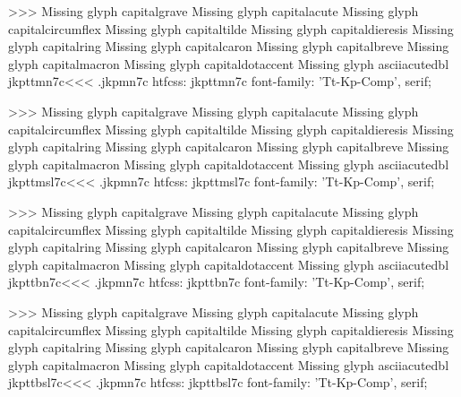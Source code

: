 >>>
Missing glyph	capitalgrave
Missing glyph	capitalacute
Missing glyph	capitalcircumflex
Missing glyph	capitaltilde
Missing glyph	capitaldieresis
Missing glyph	capitalring
Missing glyph	capitalcaron
Missing glyph	capitalbreve
Missing glyph	capitalmacron
Missing glyph	capitaldotaccent
Missing glyph	asciiacutedbl
\<jkpttmn7c\><<<
.jkpmn7c
htfcss:  jkpttmn7c  font-family: 'Tt-Kp-Comp', serif;

>>>
Missing glyph	capitalgrave
Missing glyph	capitalacute
Missing glyph	capitalcircumflex
Missing glyph	capitaltilde
Missing glyph	capitaldieresis
Missing glyph	capitalring
Missing glyph	capitalcaron
Missing glyph	capitalbreve
Missing glyph	capitalmacron
Missing glyph	capitaldotaccent
Missing glyph	asciiacutedbl
\<jkpttmsl7c\><<<
.jkpmn7c
htfcss:  jkpttmsl7c  font-family: 'Tt-Kp-Comp', serif;

>>>
Missing glyph	capitalgrave
Missing glyph	capitalacute
Missing glyph	capitalcircumflex
Missing glyph	capitaltilde
Missing glyph	capitaldieresis
Missing glyph	capitalring
Missing glyph	capitalcaron
Missing glyph	capitalbreve
Missing glyph	capitalmacron
Missing glyph	capitaldotaccent
Missing glyph	asciiacutedbl
\<jkpttbn7c\><<<
.jkpmn7c
htfcss:  jkpttbn7c  font-family: 'Tt-Kp-Comp', serif;

>>>
Missing glyph	capitalgrave
Missing glyph	capitalacute
Missing glyph	capitalcircumflex
Missing glyph	capitaltilde
Missing glyph	capitaldieresis
Missing glyph	capitalring
Missing glyph	capitalcaron
Missing glyph	capitalbreve
Missing glyph	capitalmacron
Missing glyph	capitaldotaccent
Missing glyph	asciiacutedbl
\<jkpttbsl7c\><<<
.jkpmn7c
htfcss:  jkpttbsl7c  font-family: 'Tt-Kp-Comp', serif;

